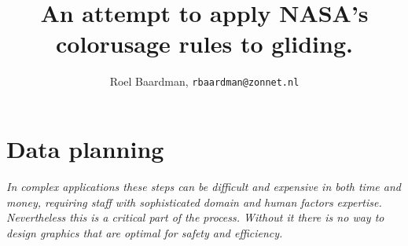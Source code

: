 \documentclass{article}
\newcommand{\myquote}[1]
{
	\textit{#1}
}
\begin{document}
\title{An attempt to apply NASA's colorusage rules to gliding.}
\author{Roel Baardman, \nolinkurl{rbaardman@zonnet.nl}}
\maketitle
\newpage
\tableofcontents
\newpage

\section{Data planning}
\myquote{In complex applications these steps can be difficult and expensive in both time and money, requiring staff with sophisticated domain and human factors expertise. Nevertheless this is a critical part of the process. Without it there is no way to design graphics that are optimal for safety and efficiency.}
\end{document}
